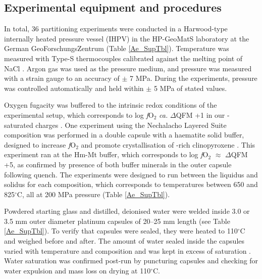\documentclass[review,authoryear,12pt]{elsarticle}
\newcommand{\dgC}{$^\circ$C }
\newcommand{\dgCs}{$^\circ$C}
\newcommand{\fO}{\textit{f}O$_{2}$ }
\begin{document}
\subsection{Experimental equipment and procedures}

        In total, 36 partitioning experiments were conducted in a Harwood-type internally heated pressure vessel (IHPV) in the HP-GeoMatS laboratory at the German GeoForschungsZentrum (Table \ref{Ae_SupTbl}). Temperature was measured with Type-S thermocouples calibrated against the melting point of NaCl \citep[][accuracy of $\pm$ 5 \dgC at 200 MPa]{Borchert2010}. Argon gas was used as the pressure medium, and pressure was measured with a strain gauge to an accuracy of $\pm$ 7 MPa. During the experiments, pressure was controlled automatically and held within $\pm$ 5 MPa of stated values. 

Oxygen fugacity was buffered to the intrinsic redox conditions of the experimental setup, which corresponds to log \fO \emph{ca.} $\Delta$QFM +1 in our -saturated charges \cite[see][]{Chou1986,Berndt2002, Jugo2010}. One experiment using the Nechalacho Layered Suite composition was performed in a double capsule with a haematite solid buffer, designed to increase \fO and promote crystallisation of -rich clinopyroxene \citep{Eugster1962}. This experiment ran at the Hm-Mt buffer, which corresponds to log \fO $\approx$ $\Delta$QFM +5, as confirmed by presence of both buffer minerals in the outer capsule following quench. The experiments were designed to run between the liquidus and solidus for each composition, which corresponds to temperatures between 650 and 825\dgCs, all at 200 MPa pressure (Table \ref{Ae_SupTbl}).

Powdered starting glass and distilled, deionised water were welded inside 3.0 or 3.5 mm outer diameter platinum capsules of 20--25 mm length (see Table \ref{Ae_SupTbl}). To verify that capsules were sealed, they were heated to 110\dgC and weighed before and after. The amount of water sealed inside the capsules varied with temperature and composition and was kept in excess of saturation \citep{Carroll1997, Moore1998, Schmidt2008}. Water saturation was confirmed post-run by puncturing capsules and checking for water expulsion and mass loss on drying at 110\dgCs.
\end{document}
